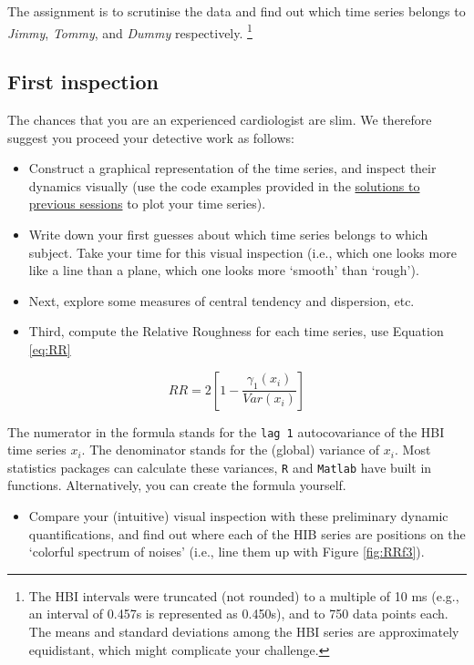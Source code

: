 \documentclass[]{book}
\providecommand{\tightlist}{%
  \setlength{\itemsep}{0pt}\setlength{\parskip}{0pt}}
\let\rmarkdownfootnote\footnote%
\def\footnote{\protect\rmarkdownfootnote}
\begin{document}
The assignment is to scrutinise the data and find out which time series
belongs to \emph{Jimmy}, \emph{Tommy}, and \emph{Dummy} respectively.
\footnote{The HBI intervals were truncated (not rounded) to a multiple
  of 10 ms (e.g., an interval of 0.457s is represented as 0.450s), and
  to 750 data points each. The means and standard deviations among the
  HBI series are approximately equidistant, which might complicate your
  challenge.}

\subsection{First inspection}\label{first-inspection}

The chances that you are an experienced cardiologist are slim. We
therefore suggest you proceed your detective work as follows:

\begin{itemize}
\tightlist
\item
  Construct a graphical representation of the time series, and inspect
  their dynamics visually (use the code examples provided in the
  \protect\hyperlink{moc1Rsol}{solutions to previous sessions} to plot
  your time series).
\item
  Write down your first guesses about which time series belongs to which
  subject. Take your time for this visual inspection (i.e., which one
  looks more like a line than a plane, which one looks more `smooth'
  than `rough').
\item
  Next, explore some measures of central tendency and dispersion, etc.
\item
  Third, compute the Relative Roughness for each time series, use
  Equation \eqref{eq:RR}
\end{itemize}

\begin{equation}
RR = 2\left[1−\frac{\gamma_1(x_i)}{Var(x_i)}\right]
\label{eq:RR}
\end{equation}

The numerator in the formula stands for the \texttt{lag\ 1}
autocovariance of the HBI time series \(x_i\). The denominator stands
for the (global) variance of \(x_i\). Most statistics packages can
calculate these variances, \texttt{R} and \texttt{Matlab} have built in
functions. Alternatively, you can create the formula yourself.

\begin{itemize}
\tightlist
\item
  Compare your (intuitive) visual inspection with these preliminary
  dynamic quantifications, and find out where each of the HIB series are
  positions on the `colorful spectrum of noises' (i.e., line them up
  with Figure \ref{fig:RRf3}).
\end{itemize}
\end{document}
